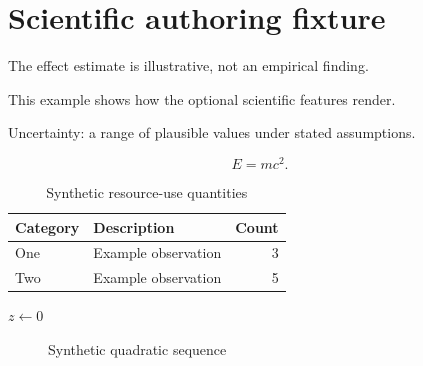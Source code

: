 \documentclass[a4paper]{article}
\begin{document}
\section{Scientific authoring fixture}
\begin{thesistakehome}
The effect estimate is illustrative, not an empirical finding.
\end{thesistakehome}
\begin{thesisplainlanguage}
This example shows how the optional scientific features render.
\end{thesisplainlanguage}
\begin{thesiskeyterms}
Uncertainty: a range of plausible values under stated assumptions.
\end{thesiskeyterms}
\begin{equation} E = mc^2. \end{equation}
\begin{table}[ht]
\centering
\caption{Synthetic resource-use quantities}
\begin{tabularx}{\linewidth}{lXr}
\toprule
Category & Description & Count\\
\midrule
One & Example observation & 3\\
Two & Example observation & 5\\
\bottomrule
\end{tabularx}
\end{table}
\begin{algorithm}[ht]
\caption{Synthetic calculation}
$z\gets 0$\;
\end{algorithm}
\begin{figure}[ht]
\centering
{}
\caption{Synthetic quadratic sequence}
\end{figure}
\end{document}
